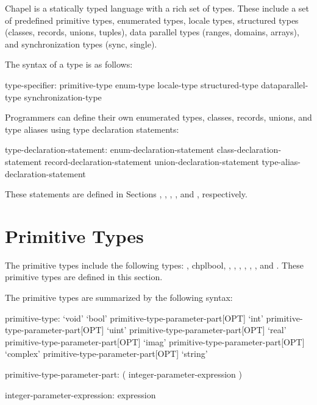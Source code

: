\label{Types}

Chapel is a statically typed language with a rich set of types.  These
include a set of predefined primitive types, enumerated types,
locale types, structured types (classes, records, unions, tuples),
data parallel types (ranges, domains, arrays), and synchronization
types (sync, single).


The syntax of a type is as follows:

\begin{syntax}
type-specifier:
  primitive-type
  enum-type
  locale-type
  structured-type
  dataparallel-type
  synchronization-type
\end{syntax}

Programmers can define their own enumerated types, classes, records,
unions, and type aliases using type declaration statements:

\begin{syntax}
type-declaration-statement:
  enum-declaration-statement
  class-declaration-statement
  record-declaration-statement
  union-declaration-statement
  type-alias-declaration-statement
\end{syntax}

These statements are defined in Sections ,
, ,
, and , respectively.

\section{Primitive Types}
\label{Primitive_Types}

The primitive types include the following types: , chpl{bool},
, , , , ,
, and .  These primitive types are defined
in this section.

The primitive types are summarized by the following syntax:
\begin{syntax}
primitive-type:
  `void'
  `bool' primitive-type-parameter-part[OPT]
  `int' primitive-type-parameter-part[OPT]
  `uint' primitive-type-parameter-part[OPT]
  `real' primitive-type-parameter-part[OPT]
  `imag' primitive-type-parameter-part[OPT]
  `complex' primitive-type-parameter-part[OPT]
  `string'

primitive-type-parameter-part:
  ( integer-parameter-expression )

integer-parameter-expression:
  expression
\end{syntax}

